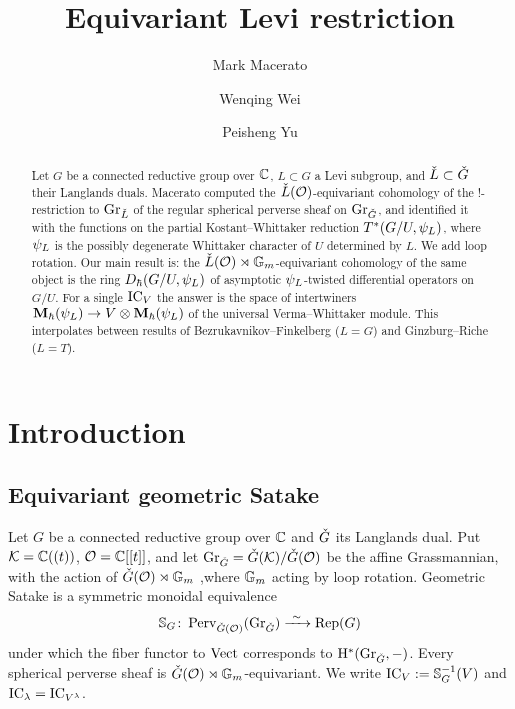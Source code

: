 \documentclass{article}
\title{Equivariant Levi restriction}
\author{Mark Macerato
  \and
  Wenqing Wei
  \and
  Peisheng Yu
}
\date{}
\theoremstyle{plain}
\theoremstyle{definition}
\theoremstyle{remark}
\numberwithin{equation}{section}
\begin{document}
\maketitle

\begin{abstract}
Let $G$ be a connected reductive group over $\mathbb{C}$, $L\subset G$ a Levi subgroup, and $\check{L}\subset{\check{G}}$ their Langlands duals. Macerato \cite{macerato2023leviequivariantrestrictionsphericalperverse} computed the $\check{L}(\mathcal{O})$-equivariant cohomology of the $!$-restriction to $\operatorname{Gr}_{\check{L}}$ of the regular spherical perverse sheaf on $\operatorname{Gr}_{{\check{G}}}$, and identified it with the functions on the partial Kostant--Whittaker reduction $T^*(G/U,\psi_L)$, where $\psi_L$ is the possibly degenerate Whittaker character of $U$ determined by $L$. We add loop rotation. Our main result is: the $\check{L}(\mathcal{O})\rtimes\mathbb{G}_m$-equivariant cohomology of the same object is the ring $D_\hbar(G/U,\psi_L)$ of asymptotic $\psi_L$-twisted differential operators on $G/U$. For a single $\operatorname{IC}_V$ the answer is the space of intertwiners $\mathbf{M}_\hbar(\psi_L)\to V\otimes\mathbf{M}_\hbar(\psi_L)$ of the universal Verma--Whittaker module. This interpolates between results of Bezrukavnikov--Finkelberg ($L=G$) and Ginzburg--Riche ($L=T$).
\end{abstract}

\tableofcontents

\section{Introduction}
\subsection{Equivariant geometric Satake}\label{sec:intro-satake}
Let $G$ be a connected reductive group over $\mathbb{C}$ and ${\check{G}}$ its Langlands dual. Put $\mathcal{K}=\mathbb{C}((t))$, $\mathcal{O}=\mathbb{C}[[t]]$, and let $\operatorname{Gr}_{{\check{G}}}={\check{G}}(\mathcal{K})/{\check{G}}(\mathcal{O})$ be the affine Grassmannian, with the action of ${\check{G}}(\mathcal{O})\rtimes\mathbb{G}_m$ ,where $\mathbb{G}_m$ acting by loop rotation. Geometric Satake is a symmetric monoidal equivalence
\begin{equation}\label{eq:satake}
\bbS_G\colon \Perv_{\cG(\calO)}(\GrG)\xrightarrow{\ \sim\ }\Rep(G)
\end{equation}
under which the fiber functor to $\operatorname{Vect}$ corresponds to $\mathrm{H}^*(\operatorname{Gr}_{{\check{G}}},-)$. Every spherical perverse sheaf is  ${\check{G}}(\mathcal{O})\rtimes\mathbb{G}_m$-equivariant. We write $\operatorname{IC}_V:=\mathbb{S}_G^{-1}(V)$ and $\operatorname{IC}_\lambda=\operatorname{IC}_{V^\lambda}$.
\end{document}
